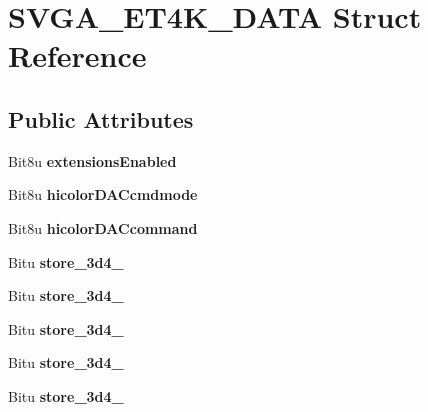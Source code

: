 \hypertarget{structSVGA__ET4K__DATA}{\section{S\-V\-G\-A\-\_\-\-E\-T4\-K\-\_\-\-D\-A\-T\-A Struct Reference}
\label{structSVGA__ET4K__DATA}
}
\subsection*{Public Attributes}
\begin{DoxyCompactItemize}
\item 
\hypertarget{structSVGA__ET4K__DATA_ae1720aeffde9b733747df1086283ec89}{Bit8u {\bfseries extensions\-Enabled}}\label{structSVGA__ET4K__DATA_ae1720aeffde9b733747df1086283ec89}

\item 
\hypertarget{structSVGA__ET4K__DATA_a5d85e5c956896ab7df3a72c6a117b3b3}{Bit8u {\bfseries hicolor\-D\-A\-Ccmdmode}}\label{structSVGA__ET4K__DATA_a5d85e5c956896ab7df3a72c6a117b3b3}

\item 
\hypertarget{structSVGA__ET4K__DATA_ad9210d3724e5fbbf0314c08af89f4c4c}{Bit8u {\bfseries hicolor\-D\-A\-Ccommand}}\label{structSVGA__ET4K__DATA_ad9210d3724e5fbbf0314c08af89f4c4c}

\item 
\hypertarget{structSVGA__ET4K__DATA_a12114f3daaf900079293ceaf172e9ea9}{Bitu {\bfseries store\-\_\-3d4\-\_}}\label{structSVGA__ET4K__DATA_a12114f3daaf900079293ceaf172e9ea9}

\item 
\hypertarget{structSVGA__ET4K__DATA_ad2d28b5b63548b5d036f147edbb3e12a}{Bitu {\bfseries store\-\_\-3d4\-\_}}\label{structSVGA__ET4K__DATA_ad2d28b5b63548b5d036f147edbb3e12a}

\item 
\hypertarget{structSVGA__ET4K__DATA_a078d0585acd467886a8da2df63cba8f3}{Bitu {\bfseries store\-\_\-3d4\-\_}}\label{structSVGA__ET4K__DATA_a078d0585acd467886a8da2df63cba8f3}

\item 
\hypertarget{structSVGA__ET4K__DATA_a119b6dd64ba791d229285cacda49e861}{Bitu {\bfseries store\-\_\-3d4\-\_}}\label{structSVGA__ET4K__DATA_a119b6dd64ba791d229285cacda49e861}

\item 
\hypertarget{structSVGA__ET4K__DATA_a9dfebb3387b7af8021f95c145cf6edcd}{Bitu {\bfseries store\-\_\-3d4\-\_}}\label{structSVGA__ET4K__DATA_a9dfebb3387b7af8021f95c145cf6edcd}


\end{DoxyCompactItemize}
